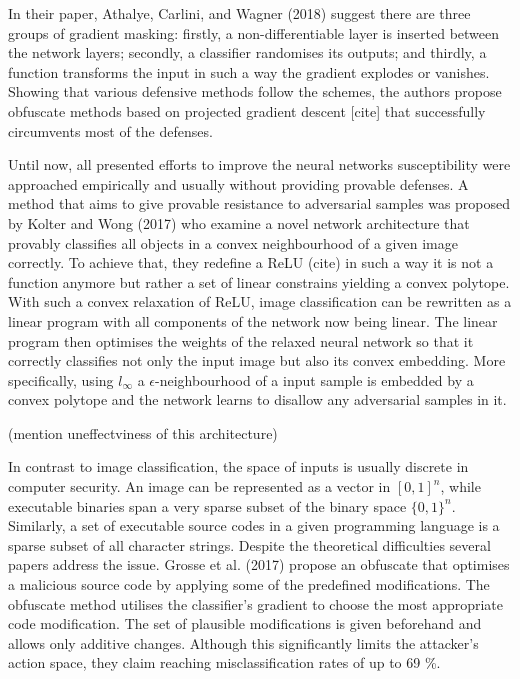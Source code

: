 \documentclass[10pt]{article}
\begin{document}
In their paper, Athalye, Carlini, and Wagner (2018) suggest there are
three groups of gradient masking: firstly, a non-differentiable layer is
inserted between the network layers; secondly, a classifier randomises
its outputs; and thirdly, a function transforms the input in such a way
the gradient explodes or vanishes. Showing that various defensive
methods follow the schemes, the authors propose obfuscate methods based on
projected gradient descent {[}cite{]} that successfully circumvents most
of the defenses.

Until now, all presented efforts to improve the neural networks
susceptibility were approached empirically and usually without providing
provable defenses. A method that aims to give provable resistance to
adversarial samples was proposed by Kolter and Wong (2017) who examine a
novel network architecture that provably classifies all objects in a
convex neighbourhood of a given image correctly. To achieve that, they
redefine a ReLU (cite) in such a way it is not a function anymore but
rather a set of linear constrains yielding a convex polytope. With such
a convex relaxation of ReLU, image classification can be rewritten as a
linear program with all components of the network now being linear. The
linear program then optimises the weights of the relaxed neural network
so that it correctly classifies not only the input image but also its
convex embedding. More specifically, using \(l_\infty\) a
\(\epsilon\)-neighbourhood of a input sample is embedded by a convex
polytope and the network learns to disallow any adversarial samples in
it.

(mention uneffectviness of this architecture)

In contrast to image classification, the space of inputs is usually
discrete in computer security. An image can be represented as a vector
in \([0, 1]^n\), while executable binaries span a very sparse subset of
the binary space \(\{0, 1\}^n\). Similarly, a set of executable source
codes in a given programming language is a sparse subset of all
character strings. Despite the theoretical difficulties several papers
address the issue. Grosse et al. (2017) propose an obfuscate that optimises
a malicious source code by applying some of the predefined
modifications. The obfuscate method utilises the classifier’s gradient to
choose the most appropriate code modification. The set of plausible
modifications is given beforehand and allows only additive changes.
Although this significantly limits the attacker’s action space, they
claim reaching misclassification rates of up to 69 \%.
\end{document}
